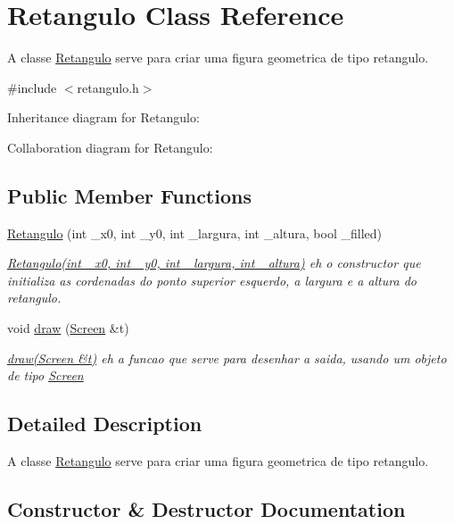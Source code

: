 \hypertarget{classRetangulo}{}\section{Retangulo Class Reference}
\label{classRetangulo}


A classe \hyperlink{classRetangulo}{Retangulo} serve para criar uma figura geometrica de tipo retangulo.  




{\ttfamily \#include $<$retangulo.\+h$>$}



Inheritance diagram for Retangulo\+:


Collaboration diagram for Retangulo\+:
\subsection*{Public Member Functions}
\begin{DoxyCompactItemize}
\item 
\hyperlink{classRetangulo_ad624708bbcb87e2125a7e71f92ba31c6}{Retangulo} (int \+\_\+x0, int \+\_\+y0, int \+\_\+largura, int \+\_\+altura, bool \+\_\+filled)
\begin{DoxyCompactList}\small\item\em \hyperlink{classRetangulo}{Retangulo(int \+\_\+x0, int \+\_\+y0, int \+\_\+largura, int \+\_\+altura)} eh o constructor que initializa as cordenadas do ponto superior esquerdo, a largura e a altura do retangulo. \end{DoxyCompactList}\item 
void \hyperlink{classRetangulo_ac088dd6d3f4f3d3f80363a868c2e74f1}{draw} (\hyperlink{classScreen}{Screen} \&t)
\begin{DoxyCompactList}\small\item\em \hyperlink{classRetangulo_ac088dd6d3f4f3d3f80363a868c2e74f1}{draw(\+Screen \&t)} eh a funcao que serve para desenhar a saida, usando um objeto de tipo \hyperlink{classScreen}{Screen} \end{DoxyCompactList}\end{DoxyCompactItemize}


\subsection{Detailed Description}
A classe \hyperlink{classRetangulo}{Retangulo} serve para criar uma figura geometrica de tipo retangulo. 

\subsection{Constructor \& Destructor Documentation}
\mbox{\label{classRetangulo_ad624708bbcb87e2125a7e71f92ba31c6}} 
